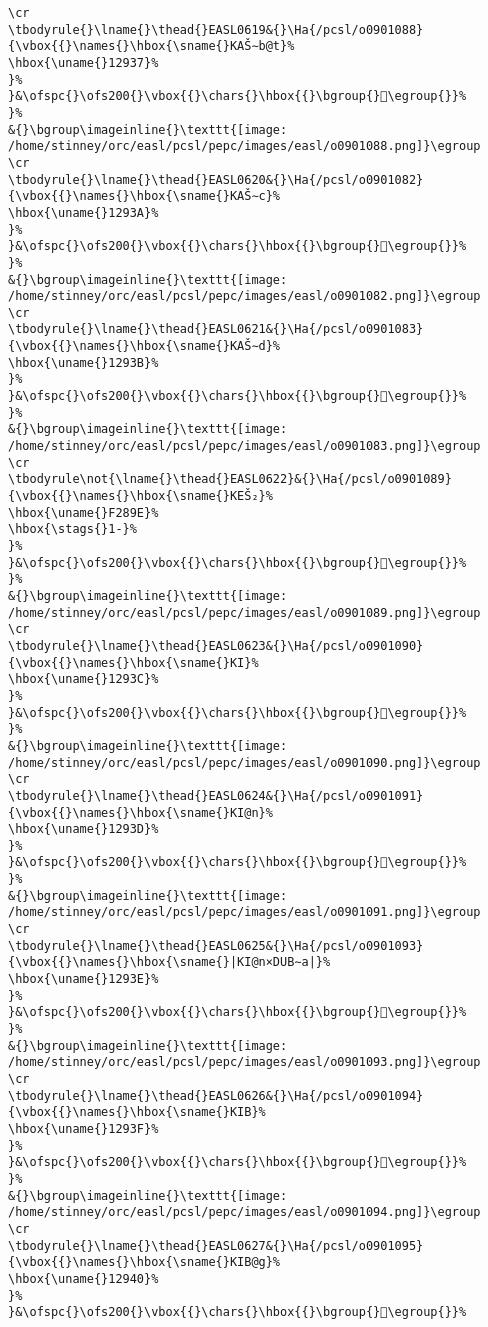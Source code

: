 \begin{verbatim}
\cr
\tbodyrule{}\lname{}\thead{}EASL0619&{}\Ha{/pcsl/o0901088}{\vbox{{}\names{}\hbox{\sname{}KAŠ∼b@t}%
\hbox{\uname{}12937}%
}%
}&\ofspc{}\ofs200{}\vbox{{}\chars{}\hbox{{}\bgroup{}𒤷\egroup{}}%
}%
&{}\bgroup\imageinline{}\texttt{[image: /home/stinney/orc/easl/pcsl/pepc/images/easl/o0901088.png]}\egroup
\cr
\tbodyrule{}\lname{}\thead{}EASL0620&{}\Ha{/pcsl/o0901082}{\vbox{{}\names{}\hbox{\sname{}KAŠ∼c}%
\hbox{\uname{}1293A}%
}%
}&\ofspc{}\ofs200{}\vbox{{}\chars{}\hbox{{}\bgroup{}𒤺\egroup{}}%
}%
&{}\bgroup\imageinline{}\texttt{[image: /home/stinney/orc/easl/pcsl/pepc/images/easl/o0901082.png]}\egroup
\cr
\tbodyrule{}\lname{}\thead{}EASL0621&{}\Ha{/pcsl/o0901083}{\vbox{{}\names{}\hbox{\sname{}KAŠ∼d}%
\hbox{\uname{}1293B}%
}%
}&\ofspc{}\ofs200{}\vbox{{}\chars{}\hbox{{}\bgroup{}𒤻\egroup{}}%
}%
&{}\bgroup\imageinline{}\texttt{[image: /home/stinney/orc/easl/pcsl/pepc/images/easl/o0901083.png]}\egroup
\cr
\tbodyrule\not{\lname{}\thead{}EASL0622}&{}\Ha{/pcsl/o0901089}{\vbox{{}\names{}\hbox{\sname{}KEŠ₂}%
\hbox{\uname{}F289E}%
\hbox{\stags{}1-}%
}%
}&\ofspc{}\ofs200{}\vbox{{}\chars{}\hbox{{}\bgroup{}󲢞\egroup{}}%
}%
&{}\bgroup\imageinline{}\texttt{[image: /home/stinney/orc/easl/pcsl/pepc/images/easl/o0901089.png]}\egroup
\cr
\tbodyrule{}\lname{}\thead{}EASL0623&{}\Ha{/pcsl/o0901090}{\vbox{{}\names{}\hbox{\sname{}KI}%
\hbox{\uname{}1293C}%
}%
}&\ofspc{}\ofs200{}\vbox{{}\chars{}\hbox{{}\bgroup{}𒤼\egroup{}}%
}%
&{}\bgroup\imageinline{}\texttt{[image: /home/stinney/orc/easl/pcsl/pepc/images/easl/o0901090.png]}\egroup
\cr
\tbodyrule{}\lname{}\thead{}EASL0624&{}\Ha{/pcsl/o0901091}{\vbox{{}\names{}\hbox{\sname{}KI@n}%
\hbox{\uname{}1293D}%
}%
}&\ofspc{}\ofs200{}\vbox{{}\chars{}\hbox{{}\bgroup{}𒤽\egroup{}}%
}%
&{}\bgroup\imageinline{}\texttt{[image: /home/stinney/orc/easl/pcsl/pepc/images/easl/o0901091.png]}\egroup
\cr
\tbodyrule{}\lname{}\thead{}EASL0625&{}\Ha{/pcsl/o0901093}{\vbox{{}\names{}\hbox{\sname{}|KI@n×DUB∼a|}%
\hbox{\uname{}1293E}%
}%
}&\ofspc{}\ofs200{}\vbox{{}\chars{}\hbox{{}\bgroup{}𒤾\egroup{}}%
}%
&{}\bgroup\imageinline{}\texttt{[image: /home/stinney/orc/easl/pcsl/pepc/images/easl/o0901093.png]}\egroup
\cr
\tbodyrule{}\lname{}\thead{}EASL0626&{}\Ha{/pcsl/o0901094}{\vbox{{}\names{}\hbox{\sname{}KIB}%
\hbox{\uname{}1293F}%
}%
}&\ofspc{}\ofs200{}\vbox{{}\chars{}\hbox{{}\bgroup{}𒤿\egroup{}}%
}%
&{}\bgroup\imageinline{}\texttt{[image: /home/stinney/orc/easl/pcsl/pepc/images/easl/o0901094.png]}\egroup
\cr
\tbodyrule{}\lname{}\thead{}EASL0627&{}\Ha{/pcsl/o0901095}{\vbox{{}\names{}\hbox{\sname{}KIB@g}%
\hbox{\uname{}12940}%
}%
}&\ofspc{}\ofs200{}\vbox{{}\chars{}\hbox{{}\bgroup{}𒥀\egroup{}}%

\end{verbatim}
